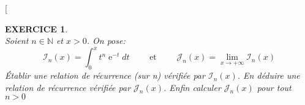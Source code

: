 \documentclass{article}%
\newtheorem{Exc}{EXERCICE}
\def\exo#1{%
  \futurelet\testchar\MaybeOptArgmyexoo}
\def\MaybeOptArgmyexoo{
  \ifx[\testchar \let\next\OptArgmyexoo
  \else \let\next\NoOptArgmyexoo \fi \next}
\def\OptArgmyexoo[#1]{%
  \begin{Exc}[#1]\normalfont}
\def\NoOptArgmyexoo{%
    \begin{Exc}\normalfont}
\newcommand{\finexo}{\end{Exc}}
\newif\ifprof
\DeclareMathOperator{\e}{e} %
\begin{document}
\exo{}
~\\
Soient $n \in \mathbb{N}$ et $x>0$. On pose:
\[
  \mathcal{I}_n(x) = \int_0^x t^n \e^{-t} dt \qquad  \text{ et } \qquad \mathcal{J}_n(x) = \lim
  \limits_{x \to +\infty} \mathcal{I}_n(x)
\]
Établir une relation de récurrence (sur n) vérifiée par $\mathcal{I}_n(x)$. En
déduire une relation de récurrence vérifiée par $\mathcal{J}_n(x)$. Enfin
calculer $\mathcal{J}_n(x)$ pour tout $n>0$
\ifprof\par
\emph{Corrigé}\par
\begin{correction}
  ~\\
  Ici on cherche une relation de réccurence sur n pour
  $\mathcal{I}_n = \int_0^x t^n \e^{-t} dt$. Pour cela il faudrait
  faire apparaitre le terme $t^{n-1}\e^{-t}$ dans l'intégrale
  $\mathcal{I}_n$ c'est à dire dérivée $t^n$. Nous avons une formule
  qui nous permet d'avoir une relation entre intégrale et dérivée qui
  est l'I.P.P. Essayons donc l'IPP en posant:
  \[
    u(t) = t^n \qquad \text{ et } \qquad v'(t) = \e^{-t}
  \]

  On a donc:
  \[
    u'(t) = n t^{n-1} \qquad \text{ et } \qquad v(t) = -\e^{-t}
  \]
  
  Ainsi en utilisant la formule d'IPP on a:
  \begin{eqnarray*} 
    \mathcal{I}_n(x) &=& \int_0^x t^n \e^{-t} dt \\
                  &=& \big[ -t^n \e^{-t} \big]_0^x - \int_0^x nt^{n-1}
                      \times (-e^{-t})dt \\
                  &=& x^n \e^{-x} + n \underbrace{\int_0^x t^{n-1}
                      e^{-t}dt}_{\mathcal{I}_{n-1}(x)}    \\
                  &=& x^n e^{-x} + n\mathcal{I}_{n-1}
  \end{eqnarray*}

  Maintenant, interessons nous à $\mathcal{J}_n(x) = \lim
  \limits_{x\to +\infty} \mathcal{I}_n(x) $
  \[
    \mathcal{J}_n(x) = \lim \limits_{x\to +\infty} \mathcal{I}_n(x)
    = \lim \limits_{x\to +\infty} (x^n e^{-x} + n\mathcal{I}_{n-1}(x))
    = \underbrace{\lim \limits_{x\to +\infty} x^n
      e^{-x}}_{\text{croissance comparée} = 0}
    + \underbrace{\lim \limits_{x\to +\infty}
      n\mathcal{I}_{n-1}(x)}_{n\mathcal{J}_{n-1}(x)}
    = n\mathcal{J}_{n-1}(x)
  \]

  On peut donc en déduire:
  \[
    \mathcal{J}_n(x) =  n \mathcal{J}_{n-1}(x)
    = n(n-1)\mathcal{J}_{n-2}(x)
    = \dots
    = n(n-1) \dots 2.1 \mathcal{J}_0(x)
    = n! ~\mathcal{J}_0(x)
  \]

  Or: $\mathcal{J}_0(x) = \lim \limits_{x \to +\infty} \int_0^x t^0
  e^{-t}dt = \lim \limits_{x \to +\infty} \int_0^x \e^{-t}dt = \lim
  \limits_{x \to +\infty} \big[ -e^{-t} \big]_0^x = \lim \limits_{x \to +\infty}
  -e^{-x} - (-e^0) = 0 + 1 = 1$

  \vspace{1\baselineskip}
  
  Finalement pour tout $n \geq 1 \quad \mathcal{J}_n(x) = n!$
\end{correction}
\fi
\finexo
\end{document}
